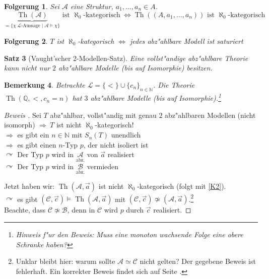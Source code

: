 \documentclass[a4paper,12pt,numbers=noenddot,parskip=full]{scrartcl}
\newcommand{\setN}{\mathbb{N}}
\newcommand{\setQ}{\mathbb{Q}}
\newcommand{\scrL}{\mathcal{L}}
\newcommand{\scrA}{\mathcal{A}}
\newcommand{\scrB}{\mathcal{B}}
\newcommand{\scrC}{\mathcal{C}}
\DeclareMathOperator{\Th}{Th}
\theoremstyle{dotless}
\newtheorem{theorem}{Satz}[section]
\newtheorem{corollary}[theorem]{Folgerung}
\newtheorem{remark}[theorem]{Bemerkung}
\begin{document}
\begin{corollary}\label{K2}
	Sei $\scrA$ eine Struktur, $a_1, \dots, a_n \in A$.
	\begin{equation*}
		\underbrace{\Th(\scrA)}_{= \{\chi~ \scrL \text{-Aussage} \mid \scrA \models \chi \}}\text{ ist } \aleph_0 \text{-kategorisch} ~\Leftrightarrow \Th((A,a_1, \dots, a_n))\text{ ist } \aleph_0 \text{-kategorisch}
	\end{equation*}
\end{corollary}
\begin{corollary}
	$T$ ist $\aleph_0$-kategorisch $\Leftrightarrow$ jedes abz"ahlbare Modell ist saturiert
\end{corollary}
\begin{theorem}[Vaught'scher 2-Modellen-Satz]\label{2M}
	Eine vollst"andige abz"ahlbare Theorie kann nicht nur $2$ abz"ahlbare Modelle (bis auf Isomorphie) besitzen.
\end{theorem}
\begin{remark}
	Betrachte $\scrL = \{<\} \cup \{c_n \}_{n \in \setN}$. Die Theorie $\Th(\setQ, <, c_n = n)$ hat $3$ abz"ahlbare Modelle (bis auf Isomorphie).\footnote{Hinweis f"ur den Beweis: Muss eine monoton wachsende Folge eine obere Schranke haben?}
\end{remark}
\begin{proof}[Beweis ]
	Sei $T$ abz"ahlbar, vollst"andig mit genau $2$ abz"ahlbaren Modellen (nicht isomorph) $\Rightarrow~ T$ ist nicht $\aleph_0$-kategorisch!\\
	$\Rightarrow$ es gibt ein $n \in \setN$ mit $S_n(T)$ unendlich\\
	$\Rightarrow$ es gibt einen $n$-Typ $p$, der nicht isoliert ist\\
	$\curvearrowright$ Der Typ $p$ wird in $\underset{\text{abz.}}{\scrA}$ von $\vec{a}$ realisiert\\
	$\curvearrowright$ Der Typ $p$ wird in $\underset{\text{abz.}}{\scrB}$ vermieden
	
	Jetzt haben wir: $\Th(\scrA, \vec{a})$ ist nicht $\aleph_0$-kategorisch (folgt mit \eqref{K2}).\\
	$\curvearrowright$ es gibt $(\scrC, \vec{c}) \models \Th(\scrA, \vec{a})$ mit $(\scrC, \vec{c}) \not\simeq (\scrA, \vec{a})$.\footnote{Unklar bleibt hier: warum sollte $\scrA \simeq \scrC$ nicht gelten? Der gegebene Beweis ist fehlerhaft. Ein korrekter Beweis findet sich auf Seite \pageref{korrekt}.}\\
	Beachte, dass $\scrC \not\simeq \scrB$, denn in $\scrC$ wird $p$ durch $\vec{c}$ realisiert.
\end{proof}
\end{document}
